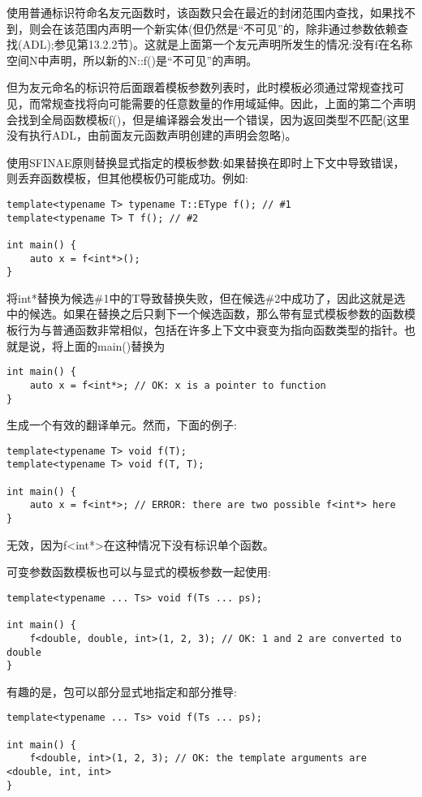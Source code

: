 使用普通标识符命名友元函数时，该函数只会在最近的封闭范围内查找，如果找不到，则会在该范围内声明一个新实体(但仍然是“不可见”的，除非通过参数依赖查找(ADL);参见第13.2.2节)。这就是上面第一个友元声明所发生的情况:没有f在名称空间N中声明，所以新的N::f()是“不可见”的声明。

但为友元命名的标识符后面跟着模板参数列表时，此时模板必须通过常规查找可见，而常规查找将向可能需要的任意数量的作用域延伸。因此，上面的第二个声明会找到全局函数模板f()，但是编译器会发出一个错误，因为返回类型不匹配(这里没有执行ADL，由前面友元函数声明创建的声明会忽略)。

使用SFINAE原则替换显式指定的模板参数:如果替换在即时上下文中导致错误，则丢弃函数模板，但其他模板仍可能成功。例如:

\begin{lstlisting}[style=styleCXX]
template<typename T> typename T::EType f(); // #1
template<typename T> T f(); // #2

int main() {
	auto x = f<int*>();
}
\end{lstlisting}

将int*替换为候选\#1中的T导致替换失败，但在候选\#2中成功了，因此这就是选中的候选。如果在替换之后只剩下一个候选函数，那么带有显式模板参数的函数模板行为与普通函数非常相似，包括在许多上下文中衰变为指向函数类型的指针。也就是说，将上面的main()替换为

\begin{lstlisting}[style=styleCXX]
int main() {
	auto x = f<int*>; // OK: x is a pointer to function
}
\end{lstlisting}

生成一个有效的翻译单元。然而，下面的例子:

\begin{lstlisting}[style=styleCXX]
template<typename T> void f(T);
template<typename T> void f(T, T);

int main() {
	auto x = f<int*>; // ERROR: there are two possible f<int*> here
}
\end{lstlisting}

无效，因为f<int*>在这种情况下没有标识单个函数。

可变参数函数模板也可以与显式的模板参数一起使用:

\begin{lstlisting}[style=styleCXX]
template<typename ... Ts> void f(Ts ... ps);

int main() {
	f<double, double, int>(1, 2, 3); // OK: 1 and 2 are converted to double
}
\end{lstlisting}

有趣的是，包可以部分显式地指定和部分推导:

\begin{lstlisting}[style=styleCXX]
template<typename ... Ts> void f(Ts ... ps);

int main() {
	f<double, int>(1, 2, 3); // OK: the template arguments are <double, int, int>
}
\end{lstlisting}









